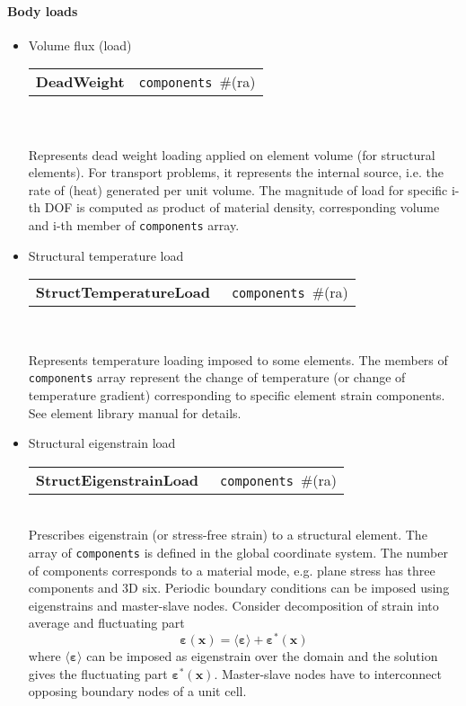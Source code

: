 \documentclass[a4paper]{report}
\newcommand{\vect}[1]{\boldsymbol{#1}} %
\newcommand{\tens}[1]{\boldsymbol{#1}} %
\newcommand{\strain}{\varepsilon}
\newcommand{\param}[1]{\texttt{#1}} %
\newcommand{\field}[2]{\param{#1}~\#{\tiny(#2)}} %
\newcommand{\entKeywordInst}[1]{\textbf{#1}} %
\newenvironment{record}[1][]{\begin{tabular}{|ll}}{\end{tabular}\\}
\newcommand{\recentry}[2]{{#1}&{#2}\\}
\newcounter{rcc}
\newenvironment{record}[1][\textwidth]{\setcounter{rcc}{0}\rowcolors{1}{lightgray}{lightgray}\tabularx{#1}{llR} \hline}
               {\endtabularx}
\newcommand{\recentry}[2]{\ifthenelse{\value{rcc}>0}{$\backslash$ \\}{\setcounter{rcc}{1}}{#1}&{#2}&}
\begin{document}
\paragraph{Body loads}
\begin{itemize}
\item Volume flux (load)

\noindent
\begin{record}[0.9\textwidth]
  \recentry{\entKeywordInst{DeadWeight}}{\field{components}{ra}}
\end{record}\\
Represents dead weight loading applied on element volume (for
structural elements). For transport problems, it represents the
internal source, i.e. the rate of (heat) generated per unit volume.
The magnitude of load for specific i-th DOF is computed as product of material density,
corresponding volume and i-th member of \param{components} array.
\item Structural temperature load

\noindent
\begin{record}[0.9\textwidth]
  \recentry{\entKeywordInst{StructTemperatureLoad}~}{\field{components}{ra}}
\end{record}

Represents temperature loading imposed to some elements. The members of
\param{components} array represent the change of temperature (or change
of temperature gradient) corresponding to
specific element strain components. See element library manual for details.

\item Structural eigenstrain load

\noindent
\begin{record}[0.9\textwidth]
  \recentry{\entKeywordInst{StructEigenstrainLoad}~}{\field{components}{ra}}
\end{record}
Prescribes eigenstrain (or stress-free strain) to a structural element. The array of \param{components} is defined in the global coordinate system. The number of components corresponds to a material mode, e.g. plane stress has three components and 3D six. Periodic boundary conditions can be imposed using eigenstrains and master-slave nodes. Consider decomposition of strain into average and fluctuating part
\begin{equation}
\tens{\strain}(\vect{x}) = \langle \tens{\strain} \rangle + \tens{\strain}^*(\vect{x})
\end{equation}
where $\langle \tens{\strain} \rangle$ can be imposed as eigenstrain over the domain and the solution gives the fluctuating part $\tens{\strain}^*(\vect{x})$. Master-slave nodes have to interconnect opposing boundary nodes of a unit cell.


\end{itemize}
\end{document}
